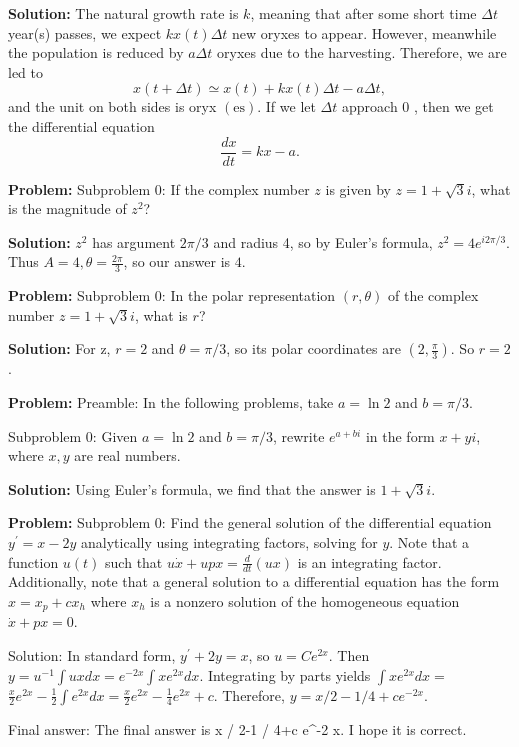 \documentclass[10pt]{article}
\begin{document}
\textbf{Solution:}
The natural growth rate is $k$, meaning that after some short time $\Delta t$ year(s) passes, we expect $k x(t) \Delta t$ new oryxes to appear. However, meanwhile the population is reduced by $a \Delta t$ oryxes due to the harvesting. Therefore, we are led to
\[
x(t+\Delta t) \simeq x(t)+k x(t) \Delta t-a \Delta t,
\]
and the unit on both sides is oryx $(\mathrm{es})$. If we let $\Delta t$ approach 0 , then we get the differential equation
\[
\boxed{\frac{d x}{d t}=k x-a} .
\]


\textbf{Problem:}
Subproblem 0: If the complex number $z$ is given by $z = 1+\sqrt{3} i$, what is the magnitude of $z^2$?


\textbf{Solution:}
$z^{2}$ has argument $2 \pi / 3$ and radius 4, so by Euler's formula, $z^{2}=4 e^{i 2 \pi / 3}$. Thus $A=4, \theta=\frac{2\pi}{3}$, so our answer is $\boxed{4}$.


\textbf{Problem:}
Subproblem 0: In the polar representation $(r, \theta)$ of the complex number $z=1+\sqrt{3} i$, what is $r$?


\textbf{Solution:}
For z, $r=2$ and $\theta=\pi / 3$, so its polar coordinates are $\left(2, \frac{\pi}{3}\right)$. So $r=\boxed{2}$.


\textbf{Problem:}
Preamble: In the following problems, take $a = \ln 2$ and $b = \pi / 3$. 

Subproblem 0: Given $a = \ln 2$ and $b = \pi / 3$, rewrite $e^{a+b i}$ in the form $x + yi$, where $x, y$ are real numbers. 


\textbf{Solution:}
Using Euler's formula, we find that the answer is $\boxed{1+\sqrt{3} i}$.


\textbf{Problem:}
Subproblem 0: Find the general solution of the differential equation $y^{\prime}=x-2 y$ analytically using integrating factors, solving for $y$. Note that a function $u(t)$ such that $u \dot{x}+u p x=\frac{d}{d t}(u x)$ is an integrating factor. Additionally, note that a general solution to a differential equation has the form $x=x_{p}+c x_{h}$ where $x_{h}$ is a nonzero solution of the homogeneous equation $\dot{x}+p x=0$.


Solution: In standard form, $y^{\prime}+2 y=x$, so $u=C e^{2 x}$. Then $y=u^{-1} \int u x d x=e^{-2 x} \int x e^{2 x} d x$. Integrating by parts yields $\int x e^{2 x} d x=$ $\frac{x}{2} e^{2 x}-\frac{1}{2} \int e^{2 x} d x=\frac{x}{2} e^{2 x}-\frac{1}{4} e^{2 x}+c$. Therefore, $y=\boxed{x / 2-1 / 4+c e^{-2 x}}$.

Final answer: The final answer is x / 2-1 / 4+c e^{-2 x}. I hope it is correct.
\end{document}
